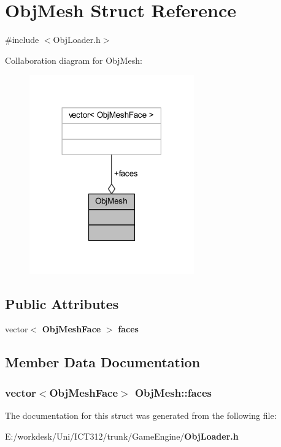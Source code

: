 \section{Obj\+Mesh Struct Reference}
\label{struct_obj_mesh}


{\ttfamily \#include $<$Obj\+Loader.\+h$>$}



Collaboration diagram for Obj\+Mesh\+:\nopagebreak
\begin{figure}[H]
\begin{center}
\leavevmode
\includegraphics[width=201pt]{dc/d95/struct_obj_mesh__coll__graph}
\end{center}
\end{figure}
\subsection*{Public Attributes}
\begin{DoxyCompactItemize}
\item 
vector$<$ {\bf Obj\+Mesh\+Face} $>$ {\bf faces}
\end{DoxyCompactItemize}


\subsection{Member Data Documentation}
\subsubsection[{faces}]{\setlength{\rightskip}{0pt plus 5cm}vector$<${\bf Obj\+Mesh\+Face}$>$ Obj\+Mesh\+::faces}\label{struct_obj_mesh_a8f2c4ff9435e3e08a74b974542c0050b}


The documentation for this struct was generated from the following file\+:\begin{DoxyCompactItemize}
\item 
E\+:/workdesk/\+Uni/\+I\+C\+T312/trunk/\+Game\+Engine/{\bf Obj\+Loader.\+h}\end{DoxyCompactItemize}
